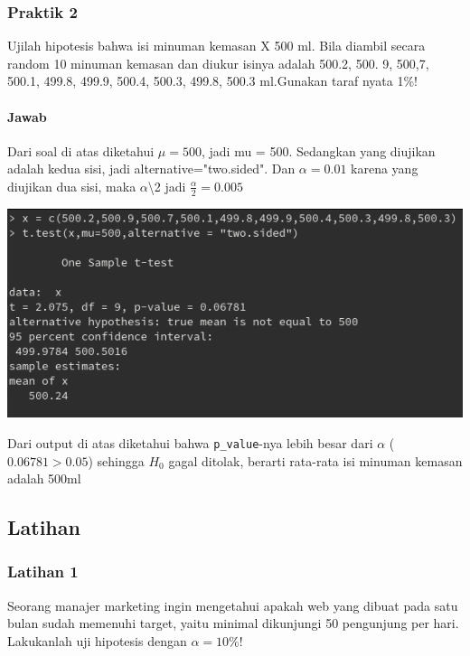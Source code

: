 \documentclass[a4paper,12pt]{article}
\begin{document}
\subsubsection{Praktik 2}
Ujilah hipotesis bahwa isi minuman kemasan X 500 ml. Bila diambil secara random 10 minuman kemasan dan diukur isinya adalah 500.2, 500. 9, 500,7,  500.1,  499.8,  499.9, 500.4,  500.3, 499.8, 500.3 ml.Gunakan taraf nyata 1\%! 

\paragraph{Jawab\\}
Dari soal di atas diketahui $\mu = 500$, jadi mu = 500. Sedangkan yang diujikan adalah kedua sisi, jadi alternative="two.sided". Dan $\alpha = 0.01$ karena yang diujikan dua sisi, maka $\alpha$\textbackslash2 jadi $\frac{\alpha}{2} = 0.005$
\begin{center}
    \includegraphics[width = 0.8\linewidth]{prak2.png}
\end{center}
Dari output di atas diketahui bahwa \texttt{p\_value}-nya lebih besar dari $\alpha$ ($0.06781 > 0.05$) sehingga $H_{0}$ gagal ditolak, berarti rata-rata isi minuman kemasan adalah 500ml

\subsection{Latihan}
\subsubsection{Latihan 1}
Seorang manajer marketing  ingin mengetahui apakah web yang dibuat pada satu bulan sudah memenuhi target, yaitu minimal dikunjungi 50 pengunjung per hari. Lakukanlah uji hipotesis dengan $\alpha = 10\%$! 
\end{document}
